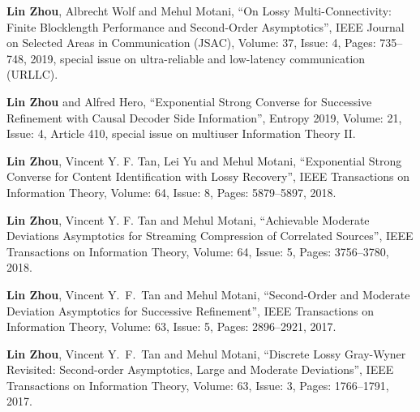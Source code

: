\documentclass[12pt]{article} %
\begin{document}
\begin{etaremune}
\item \textbf{Lin Zhou}, Albrecht Wolf and Mehul Motani,  ``On Lossy Multi-Connectivity: Finite Blocklength Performance and Second-Order Asymptotics'', IEEE Journal on Selected Areas in Communication (JSAC), Volume: 37, Issue: 4, Pages: 735--748, 2019, special issue on ultra-reliable and low-latency communication (URLLC).
\item \textbf{Lin Zhou} and Alfred Hero, ``Exponential Strong Converse for Successive Refinement with Causal Decoder Side Information'', Entropy 2019, Volume: 21, Issue: 4, Article 410, special issue on multiuser Information Theory II.
\item \textbf{Lin Zhou}, Vincent Y. F. Tan, Lei Yu and Mehul Motani,  ``Exponential Strong Converse for Content Identification with Lossy Recovery'', IEEE Transactions on Information Theory, Volume: 64, Issue: 8, Pages: 5879--5897, 2018.
\item \textbf{Lin Zhou}, Vincent Y. F. Tan and Mehul Motani,  ``Achievable Moderate Deviations Asymptotics for Streaming Compression of Correlated Sources'', IEEE Transactions on Information Theory, Volume: 64, Issue: 5, Pages: 3756--3780, 2018.
\item \textbf{Lin Zhou}, Vincent Y.\ F.\ Tan and Mehul Motani,  ``Second-Order and Moderate Deviation Asymptotics for Successive Refinement'', IEEE Transactions on Information Theory, Volume: 63, Issue: 5, Pages: 2896--2921, 2017.
\item \textbf{Lin Zhou}, Vincent Y.\ F.\ Tan and Mehul Motani,  ``Discrete Lossy Gray-Wyner Revisited: Second-order Asymptotics, Large and Moderate Deviations'', IEEE Transactions on Information Theory, Volume: 63, Issue: 3, Pages: 1766--1791, 2017.
\end{etaremune}
\end{document}
